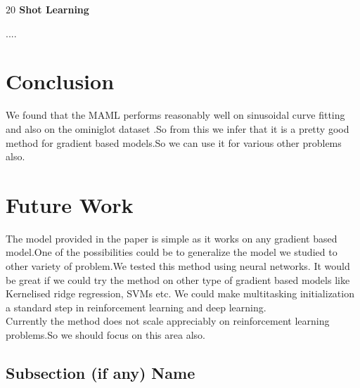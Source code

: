 \documentclass[a4paper]{article}
\begin{document}
\textbf{$20$ Shot Learning}
\begin{table}[width=\paperwidth]
\centering
{}
\end{table}

....

\section{Conclusion}

We found that the MAML performs reasonably well on sinusoidal curve fitting and also on the ominiglot dataset .So from this we infer that it is a pretty good method for gradient based models.So we can use it for various other problems also. 
\section{Future Work}

The model provided in the paper is simple as it works on any gradient based model.One of the possibilities could be to generalize the model we studied  to other variety of problem.We tested this method using neural networks. It would be great if we could try the method on other type of gradient based models like Kernelised ridge regression, SVMs etc. We could make multitasking initialization a standard step in reinforcement learning and deep learning.\\
Currently the method does not scale appreciably on reinforcement learning problems.So we should focus on this area also.

\subsection*{Subsection (if any) Name}
\end{document}
